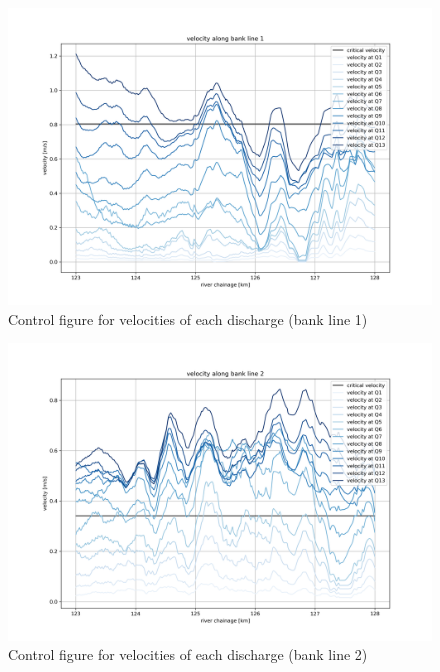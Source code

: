 \begin{figure}
\includegraphics[width=\textwidth]{figures/8_velocity_bank_1.png}
\caption{Control figure for velocities of each discharge (bank line 1)}
\label{Fig2.10}
\end{figure}
\clearpage
\begin{figure}
\includegraphics[width=\textwidth]{figures/9_velocity_bank_2.png}
\caption{Control figure for velocities of each discharge (bank line 2)}
\label{Fig2.11}
\end{figure}

